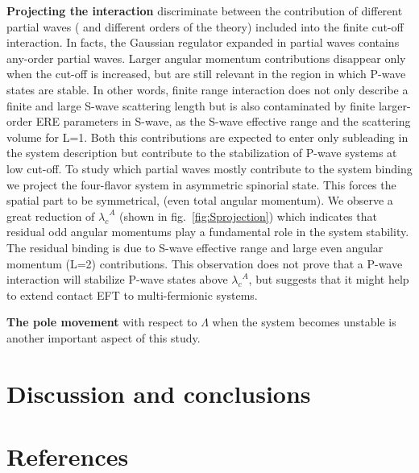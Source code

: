 \documentclass[preprint,12pt]{elsarticle}
\newcommand{\lc}{\ensuremath{\lambda_c}}
\newcommand{\figref}[1]{fig.~\ref{#1}}
\begin{document}
\textbf{Projecting the interaction} discriminate between the contribution of different partial waves ( and different orders of the theory) included into the finite cut-off interaction.
In facts, the Gaussian regulator expanded in partial waves contains any-order partial waves.
Larger angular momentum contributions disappear only when the cut-off is increased, but are still relevant in the region in which P-wave states are stable. 
In other words, finite range interaction does not only describe a finite and large S-wave scattering length but is also contaminated by finite larger-order ERE parameters in S-wave, as the S-wave effective range and the scattering volume for L=1.
Both this contributions are expected to enter only subleading in the system description but contribute to the stabilization of P-wave systems at low cut-off.
To study which partial waves mostly contribute to the system binding we project the four-flavor system in asymmetric spinorial state.
This forces the spatial part to be symmetrical, (even total angular momentum). 
We observe a great reduction of $\lc^A$ (shown in \figref{fig:Sprojection}) which indicates that residual odd angular momentums play a fundamental role in the system stability.
The residual binding is due to S-wave effective range and large even angular momentum (L=2) contributions.
This observation does not prove that a P-wave interaction will stabilize P-wave states above $\lc^A$, but suggests that it might help to extend contact EFT to multi-fermionic systems.

\textbf{The pole movement} with respect to $\Lambda$ when the system becomes unstable is another important aspect of this study.



\section{Discussion and conclusions}

\newpage
\section*{References}


\end{document}

